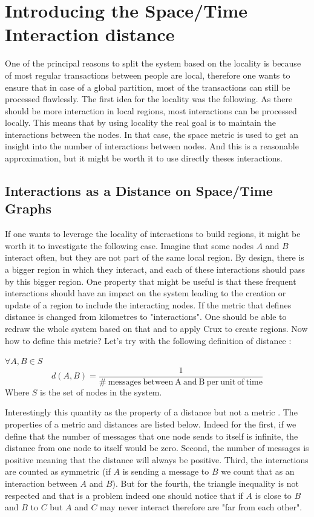 \documentclass[a4paper,11pt,oneside]{report}
\begin{document}
\section{Introducing the Space/Time Interaction distance}
One of the principal reasons to split the system based on the locality is
because of most regular transactions between people are local, therefore one
wants to ensure that in case of a global partition, most of the transactions
can still be processed flawlessly. The first idea for the locality was the
following. As there should be more interaction in local regions, most
interactions can be processed locally. This means that by using locality the
real goal is to maintain the interactions between the nodes. In that case,
the space metric is used to get an insight into the number of interactions
between nodes. And this is a reasonable approximation, but it might be worth it
to use directly theses interactions. 

\subsection{Interactions as a Distance on Space/Time Graphs}

If one wants to leverage the locality of interactions to build regions, it
might be worth it to investigate the following case. Imagine that some nodes
$A$ and $B$ interact often, but they are not part of the same local
region. By design, there is a bigger region in which they interact, and each of
these interactions should pass by this bigger region. One property that might
be useful is that these frequent interactions should have an impact on the
system leading to the creation or update of a region to include the interacting nodes. If the
metric that defines distance is changed from kilometres to "interactions". One
should be able to redraw the whole system based on that and to apply Crux to
create regions. Now how to define this metric? Let's try with the
following definition of distance :


$\forall A, B \in S$
\begin{equation} \label{definition-distance}
  d(A,B) = \frac{1}{ \mathrm{\#\ messages\ between\ A\ and\ B\ per\ unit\ of\ time} } 
\end{equation}
Where $S$ is the set of nodes in the system.

Interestingly this quantity as the property of a distance but not a metric
\cite{Greenhoe2016}. The properties of a metric and distances are listed below.
Indeed for the first, if we define that the number of messages that one node
sends to itself is infinite, the distance from one node to itself would be
zero. Second, the number of messages is positive meaning that the distance will
always be positive. Third, the interactions are counted as symmetric (if $A$ is
sending a message to $B$ we count that as an interaction between $A$ and $B$).
But for the fourth, the triangle inequality is not respected and that is a
problem indeed one should notice that if $A$ is close to $B$ and $B$ to $C$ but
$A$ and $C$ may never interact therefore are "far from each other".  
\end{document}

